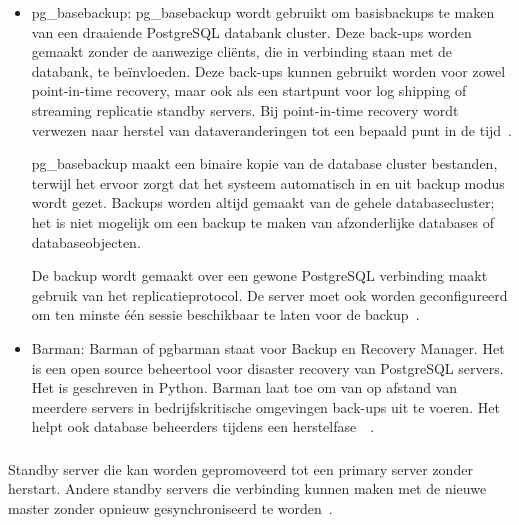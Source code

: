 \begin{itemize}
    \item pg\_basebackup: pg\_basebackup wordt gebruikt om basisbackups te maken van een draaiende PostgreSQL databank cluster. Deze back-ups worden gemaakt zonder de aanwezige cliënts, die in verbinding staan met de databank, te beïnvloeden. Deze back-ups kunnen gebruikt worden voor zowel point-in-time recovery, maar ook als een startpunt voor log shipping of streaming replicatie standby servers. Bij point-in-time recovery wordt verwezen naar herstel van dataveranderingen tot een bepaald punt in de tijd~\autocite{MySQL2021}. %
    
    pg\_basebackup maakt een binaire kopie van de database cluster bestanden, terwijl het ervoor zorgt dat het systeem automatisch in en uit backup modus wordt gezet. Backups worden altijd gemaakt van de gehele databasecluster; het is niet mogelijk om een backup te maken van afzonderlijke databases of databaseobjecten. 
    
    De backup wordt gemaakt over een gewone PostgreSQL verbinding maakt gebruik van het replicatieprotocol. De server moet ook worden geconfigureerd om ten minste één sessie beschikbaar te laten voor de backup~\autocite{PostgreSQL2021c}. %
    \newline
    \item Barman: Barman of pgbarman staat voor Backup en Recovery Manager. Het is een open source beheertool voor disaster recovery van PostgreSQL servers. Het is geschreven in Python. Barman laat toe om van op afstand van meerdere servers in bedrijfskritische omgevingen back-ups uit te voeren. Het helpt ook database beheerders tijdens een herstelfase~\autocite{Barman2020}~\autocite{Barman2020a}. %
\end{itemize}


\subsubsection{}
\label{subsubsec:Promotie standby server}
Standby server die kan worden gepromoveerd tot een primary server zonder herstart. Andere standby servers die verbinding kunnen maken met de nieuwe master zonder opnieuw gesynchroniseerd te worden~\autocite{2020a}.

